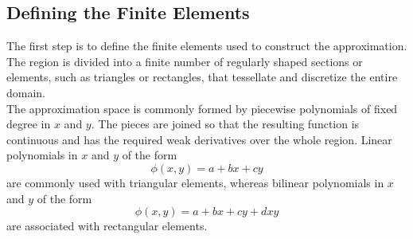 \documentclass[a4paper]{article}
\begin{document}
\subsection{Defining the Finite Elements}
The first step is to define the finite elements used to construct the approximation. The region is divided into a finite number of regularly shaped sections or elements, such as triangles or rectangles, that tessellate and discretize the entire domain.\\

The approximation space is commonly formed by piecewise polynomials of fixed degree in $x$ and $y$. The pieces are joined so that the resulting function is continuous and has the required weak derivatives over the whole region. Linear polynomials in $x$ and $y$ of the form
\begin{equation}
\phi(x,y)=a+bx+cy
\end{equation}
are commonly used with triangular elements, whereas bilinear polynomials in $x$ and $y$ of the form
\begin{equation}
\phi(x,y)=a+bx+cy+dxy
\end{equation}
are associated with rectangular elements.\\
\end{document}
